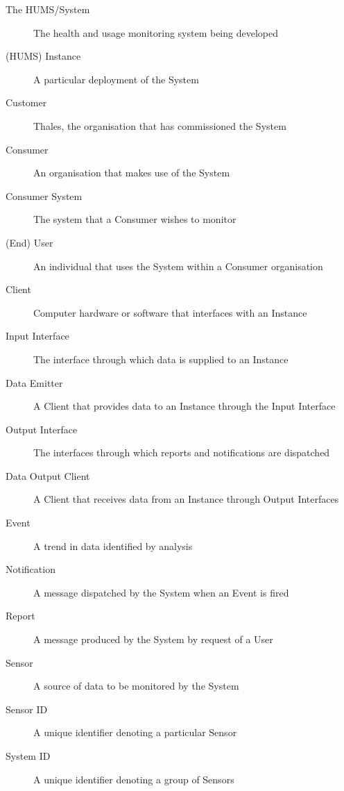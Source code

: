 \documentclass[10pt,a4paper]{article}
\begin{document}
\begin{description}%
	\item[The HUMS/System] The health and usage monitoring system being developed
	\item[(HUMS) Instance] A particular deployment of the System
	\vspace{0.15cm}
	\item[Customer] Thales, the organisation that has commissioned the System
	\item[Consumer] An organisation that makes use of the System
	\item[Consumer System] The system that a Consumer wishes to monitor
	\item[(End) User] An individual that uses the System within a Consumer organisation
	\vspace{0.15cm}
	\item[Client] Computer hardware or software that interfaces with an Instance
	\item[Input Interface] The interface through which data is supplied to an Instance
	\item[Data Emitter] A Client that provides data to an Instance through the Input Interface
	\item[Output Interface] The interfaces through which reports and notifications are dispatched
	\item[Data Output Client] A Client that receives data from an Instance through Output Interfaces
	\vspace{0.15cm}
	\item[Event] A trend in data identified by analysis
	\item[Notification] A message dispatched by the System when an Event is fired
	\item[Report] A message produced by the System by request of a User
	\vspace{0.14cm}
	\item[Sensor] A source of data to be monitored by the System
	\item[Sensor ID] A unique identifier denoting a particular Sensor
	\item[System ID] A unique identifier denoting a group of Sensors
\end{description}

\end{document}
